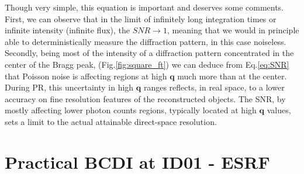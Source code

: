 Though very simple, this equation is important and deserves some comments.
First, we can observe that in the limit of infinitely long integration times or infinite intensity (infinite flux), 
the $SNR \rightarrow 1$, meaning that we would in principle able to deterministically measure the diffraction pattern, 
in this case noiseless. Secondly, being most of the intensity of a diffraction 
pattern concentrated in the center of the Bragg peak, (Fig.\ref{fig:square_ft}) we can deduce from Eq.\ref{eq:SNR} that Poisson 
noise is affecting regions at high $\mathbf{q}$ much more than at the center. During PR, this uncertainty in high $\mathbf{q}$ ranges 
reflects, in real space, to a lower accuracy on fine resolution features of the reconstructed objects. The SNR, by mostly 
affecting lower photon counts regions, typically located at high $\mathbf{q}$ values, sets a limit to the actual
attainable direct-space resolution.




\section{Practical BCDI at ID01 - ESRF }\label{chp:id01}

